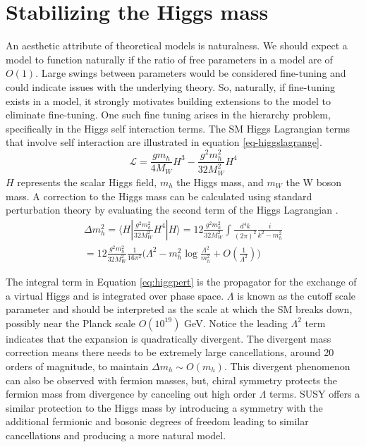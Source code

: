 \section{Stabilizing the Higgs mass}

An aesthetic attribute of theoretical models is naturalness. We should expect a model to function naturally if the ratio of free parameters in a model are of $O(1)$. Large swings between parameters would be considered fine-tuning and could indicate issues with the underlying theory. So, naturally, if fine-tuning exists in a model, it strongly motivates building extensions to the model to eliminate fine-tuning. %
One such fine tuning arises in the hierarchy problem, specifically in the Higgs self interaction terms. The SM Higgs Lagrangian terms that involve self interaction are illustrated in equation \ref{eq-higgslagrange}.
\begin{equation}
\label{eq-higgslagrange}
\mathcal{L}=\frac{gm_h}{4M_W}H^3 - \frac{g^2m_h^2}{32M_W^2}H^4
\end{equation}
$H$ represents the scalar Higgs field, $m_h$ the Higgs mass, and $m_W$ the W boson  mass. A correction to the Higgs mass can be calculated using standard perturbation theory by evaluating the second term of the Higgs Lagrangian \cite{Baer:2007izw}. 
\begin{equation}
\label{eq:higgpert}
\begin{split}
\Delta m_h^2 = \langle H | \frac{g^2m_h^2}{32M_W^2} H^4 | H  \rangle = 12\frac{g^2m_h^2}{32M_W^2}\int \frac{d^4 k}{(2\pi)^2} \frac{i}{k^2 - m_h^2}\\
= 12\frac{g^2m_h^2}{32M_W^2} \frac{1}{16\pi^2}\big( \Lambda^2 - m_h^2\log\frac{\Lambda^2}{m_h^2} + O(\frac{1}{\Lambda^2})\big)
\end{split} 
\end{equation}
 
The integral term in Equation \ref{eq:higgpert}  is the propagator for the exchange of a virtual Higgs and is integrated over phase space. $\Lambda$ is known as the cutoff scale parameter and should be interpreted as the scale at which the SM breaks down, possibly near the Planck scale $O(10^{19})$ GeV. Notice the leading $\Lambda^2$ term indicates that the expansion is quadratically divergent. The divergent mass correction means there needs to be extremely large cancellations, around 20 orders of magnitude, to maintain $\Delta m_h \sim O(m_h)$. This divergent phenomenon can also be observed with fermion masses, but, chiral symmetry protects the fermion mass from divergence by canceling out high order $\Lambda$ terms. SUSY offers a similar protection to the Higgs mass by introducing a symmetry with the additional fermionic and bosonic degrees of freedom leading to similar cancellations and producing a more natural model. 


